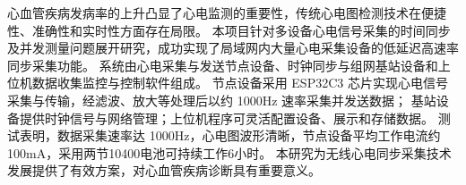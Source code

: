 
{}

\begin{abstractcn}
心血管疾病发病率的上升凸显了心电监测的重要性，传统心电图检测技术在便捷性、准确性和实时性方面存在局限。
本项目针对多设备心电信号采集的时间同步及并发测量问题展开研究，成功实现了局域网内大量心电采集设备的低延迟高速率同步采集功能。
系统由心电采集与发送节点设备、时钟同步与组网基站设备和上位机数据收集监控与控制软件组成。
节点设备采用 ESP32C3 芯片实现心电信号采集与传输，经滤波、放大等处理后以约 1000Hz 速率采集并发送数据；
基站设备提供时钟信号与网络管理；上位机程序可灵活配置设备、展示和存储数据。
测试表明，数据采集速率达 1000Hz，心电图波形清晰，节点设备平均工作电流约 100mA，采用两节10400电池可持续工作6小时。
本研究为无线心电同步采集技术发展提供了有效方案，对心血管疾病诊断具有重要意义。


\end{abstractcn}